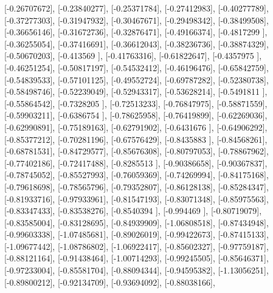 \documentclass{article}
\begin{document}
       [-0.26707672],
       [-0.23840277],
       [-0.25371784],
       [-0.27412983],
       [-0.40277789],
       [-0.37277303],
       [-0.31947932],
       [-0.30467671],
       [-0.29498342],
       [-0.38499508],
       [-0.36656146],
       [-0.31672736],
       [-0.32876471],
       [-0.49166374],
       [-0.4817299 ],
       [-0.36255054],
       [-0.37416691],
       [-0.36612043],
       [-0.38236736],
       [-0.38874329],
       [-0.50670203],
       [-0.413569  ],
       [-0.41763316],
       [-0.61822647],
       [-0.4357975 ],
       [-0.46251254],
       [-0.50817197],
       [-0.54532412],
       [-0.46196476],
       [-0.65842759],
       [-0.54839533],
       [-0.57101125],
       [-0.49552724],
       [-0.69787282],
       [-0.52380738],
       [-0.58498746],
       [-0.52239049],
       [-0.52943317],
       [-0.53628214],
       [-0.5491811 ],
       [-0.55864542],
       [-0.7328205 ],
       [-0.72513233],
       [-0.76847975],
       [-0.58871559],
       [-0.59903211],
       [-0.6386754 ],
       [-0.78625958],
       [-0.76419899],
       [-0.62269036],
       [-0.62990891],
       [-0.75189163],
       [-0.62791902],
       [-0.6431676 ],
       [-0.64906292],
       [-0.85377212],
       [-0.70281196],
       [-0.67576429],
       [-0.8435883 ],
       [-0.84568261],
       [-0.68781531],
       [-0.84729577],
       [-0.85676308],
       [-0.80797053],
       [-0.78867962],
       [-0.77402186],
       [-0.72417488],
       [-0.8285513 ],
       [-0.90386658],
       [-0.90367837],
       [-0.78745052],
       [-0.85527993],
       [-0.76059369],
       [-0.74269994],
       [-0.84175168],
       [-0.79618698],
       [-0.78565796],
       [-0.79352807],
       [-0.86128138],
       [-0.85284347],
       [-0.81933716],
       [-0.97933961],
       [-0.81547193],
       [-0.83071348],
       [-0.85975563],
       [-0.83347433],
       [-0.83538276],
       [-0.8540394 ],
       [-0.994469  ],
       [-0.80719079],
       [-0.83585004],
       [-0.83128695],
       [-0.84939909],
       [-1.06808518],
       [-0.87434948],
       [-0.99603338],
       [-1.07485681],
       [-0.89026019],
       [-0.99422673],
       [-0.87415133],
       [-1.09677442],
       [-1.08786802],
       [-1.06922417],
       [-0.85602327],
       [-0.97759187],
       [-0.88121164],
       [-0.91438464],
       [-1.00714293],
       [-0.99245505],
       [-0.85646371],
       [-0.97233004],
       [-0.85581704],
       [-0.88094344],
       [-0.94595382],
       [-1.13056251],
       [-0.89800212],
       [-0.92134709],
       [-0.93694092],
       [-0.88038166],
\end{document}
